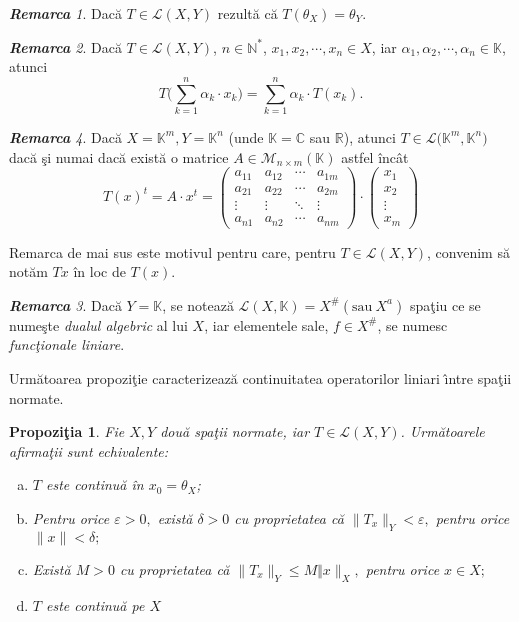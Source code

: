 \documentclass[ a4paper, 12pt]{report}
\newtheorem{prop}[theorem]{\bf Propozi\c tia }
\theoremstyle{definition}
\theoremstyle{remark}
\newtheorem{remarc}{\bf Remarca}[section]
\numberwithin{equation}{section}
\begin{document}
\begin{remarc}
Dac\u a $T \in \mathcal{L}(X,Y)$ rezult\u a c\u a $T(\theta_{X}) = \theta_{Y}$.
\end{remarc}

\begin{remarc}
Dac\u a $T \in \mathcal{L}(X,Y)$,  $n \in \mathbb{N}^{\ast}$, $x_1,x_2,\cdots,x_n \in X$, iar $\alpha_1,\alpha_2, \cdots, \alpha_n \in \mathbb{K}$, atunci
$$T\Big( \sum\limits_{k=1}^{n} \alpha_k \cdot x_k \Big) = \sum\limits_{k=1}^{n} \alpha_k \cdot T(x_k).$$
\end{remarc}

\begin{remarc}
Dac\u a $X = \mathbb{K}^{m}, Y = \mathbb{K}^{n}$ (unde $\mathbb{K} = \mathbb{C}$ sau $\mathbb{R}$), atunci $T \in \mathcal{L}\Big( \mathbb{K}^{m}, \mathbb{K}^{n} \Big)$ dac\u a \c si numai dac\u a exist\u a o matrice $A \in \mathcal{M}_{n \times m}(\mathbb{K})$ astfel \^inc\^at
$$ T(x)^{t} = A \cdot x^{t} = \begin{pmatrix}
  a_{11} & a_{12} & \cdots & a_{1m} \\
  a_{21} & a_{22} & \cdots & a_{2m} \\
  \vdots  & \vdots  & \ddots & \vdots  \\
  a_{n1} & a_{n2} & \cdots & a_{nm}
 \end{pmatrix} \cdot \begin{pmatrix}
 x_1\\
 x_2\\
 \vdots\\
 x_m
 \end{pmatrix}$$

\medskip
Remarca de mai sus este motivul pentru care, pentru $T \in \mathcal{L}(X,Y)$, convenim s\u a not\u am $T{x}$ \^in loc de $T(x)$.
\medskip

\begin{remarc}
Dac\u a $Y = \mathbb{K}$, se noteaz\u a $\mathcal{L}(X,\mathbb{K}) = X^{\#} ( \mbox{sau}\ X^{a})$ spa\c tiu ce se nume\c ste {\it dualul algebric} al lui $X$, iar elementele sale, $f \in X^{\#}$, se  numesc {\it func\c tionale liniare}.
\end{remarc}

Urm\u atoarea propozi\c tie caracterizeaz\u a continuitatea operatorilor liniari \^\i ntre spa\c tii normate.

\begin{prop}
Fie $X, Y$ dou\u a spa\c tii normate,  iar $T \in \mathcal{L}(X,Y)$. Urm\u atoarele afirma\c tii sunt echivalente:
\begin{enumerate}[(a)]
\item $T$ este continu\u a \^in $x_0 = \theta_{X}$;
\item Pentru orice $\varepsilon>0,$ exist\u a $\delta>0$ cu proprietatea c\u a $\lVert T_x \rVert_Y<\varepsilon,$ pentru orice $\lVert x \rVert<\delta;$
\item Exist\u a $M>0$ cu proprietatea c\u a $\lVert T_x \rVert_Y \leq M \Vert x \rVert_X,$ pentru orice $x \in X;$
\item $T$ este continu\u a pe $X$
\end{enumerate}
\end{prop}


\end{remarc}
\end{document}

